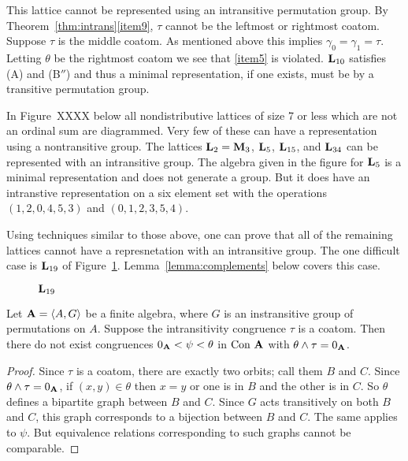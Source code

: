 This lattice cannot be represented using an intransitive permutation group. 
By Theorem~\ref{thm:intrans}\eqref{item9}, $\tau$ cannot be the leftmost or rightmost
coatom. Suppose $\tau$ is the middle coatom.  
As mentioned above this implies
$\gamma_0 = \gamma_1 = \tau$. Letting $\theta$ be the rightmost coatom we 
see that \eqref{item5} is violated. 
$\bL_{10}$ satisfies (A) and (B$''$) and thus a minimal representation, if one 
exists, must be by a transitive permutation group.

In Figure~XXXX below all nondistributive lattices
of size 7 or less which are not an ordinal sum are diagrammed. 
Very few of these can have a representation using a nontransitive
group. The lattices $\bL_2 = \bM_3$, $\bL_5$, $\bL_{15}$, 
and $\bL_{34}$ can be represented with an intransitive group. 
The algebra given in the figure for $\bL_5$ is a minimal 
representation and does not generate a group. But it does 
have an intranstive representation on a six element set with
the operations $(1,2,0,4,5,3)$ and $(0,1,2,3,5,4)$. 

Using techniques similar to those above, one
can prove that all of the remaining lattices cannot
have a represnetation with an intransitive group.
The one difficult case is $\bL_{19}$ of Figure~\ref{fig:L19}.
Lemma~\ref{lemma:complements} below covers this case.

\begin{figure}[htb]
\begin{center}
  \begin{tikzpicture}[scale=1]
    
  \end{tikzpicture}
\end{center}
\caption{$\bL_{19}$}\label{fig:L19}
\end{figure}

\begin{lemma}\label{lemma:complements}
Let $\bA = \<A,G\>$ be a finite algebra, where
$G$ is an instransitive group of permutations on $A$.
Suppose the intransitivity congruence $\tau$ is a coatom.
Then there do not exist congruences
$0_\bA < \psi < \theta$ in $\Con \bA$
with $\theta \meet \tau = 0_\bA$. 
\end{lemma}

\begin{proof}
Since $\tau$ is a coatom, there are exactly two orbits; call
them $B$ and $C$. Since $\theta \meet \tau = 0_\bA$, if
$(x,y) \in \theta$ then $x=y$ or one is in $B$ and the other
is in $C$. So $\theta$ defines a bipartite graph between
$B$ and $C$. Since $G$ acts transitively on both $B$ and $C$,
this graph corresponds to a bijection between $B$ and $C$. 
The same applies to $\psi$. But equivalence relations
corresponding to such graphs cannot be comparable.
\end{proof}




